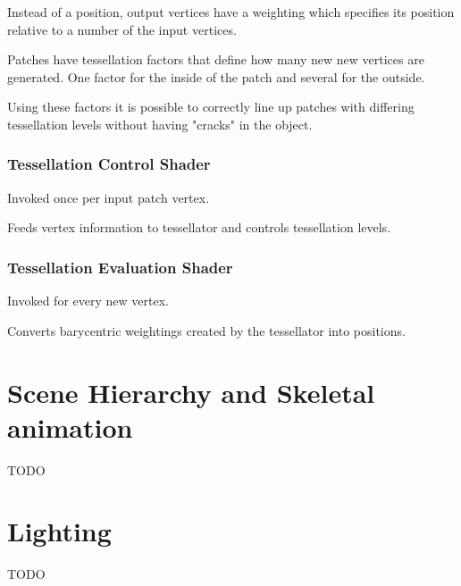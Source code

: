 \documentclass[a4paper]{article}
\begin{document}
Instead of a position, output vertices have a weighting which specifies its
position relative to a number of the input vertices.

Patches have tessellation factors that define how many new new vertices are
generated. One factor for the inside of the patch and several for the outside.

Using these factors it is possible to correctly line up patches with differing
tessellation levels without having "cracks" in the object.

\subsubsection{Tessellation Control Shader}

Invoked once per input patch vertex.

Feeds vertex information to tessellator and controls tessellation levels.

\subsubsection{Tessellation Evaluation Shader}

Invoked for every new vertex.

Converts barycentric weightings created by the tessellator into positions.

\section{Scene Hierarchy and Skeletal animation}

TODO

\section{Lighting}

TODO
\end{document}
